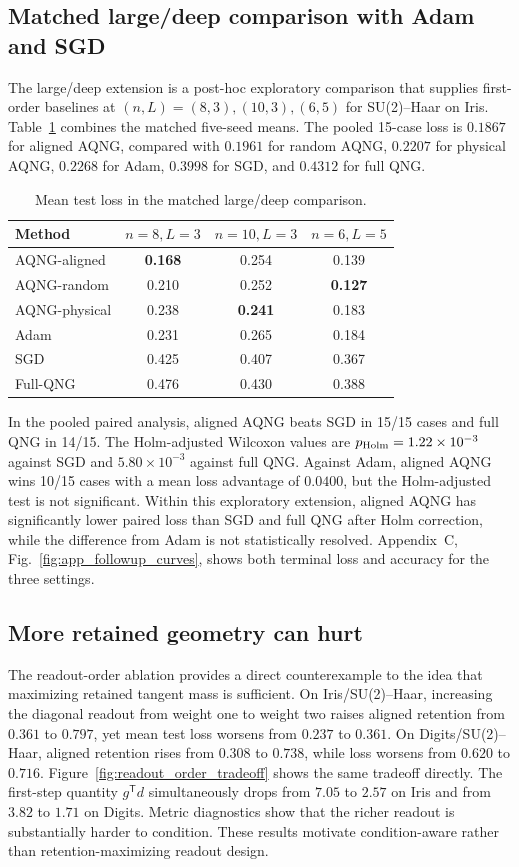 \subsection{Matched large/deep comparison with Adam and SGD}
The large/deep extension is a post-hoc exploratory comparison that supplies first-order baselines at $(n,L)=(8,3),(10,3),(6,5)$ for SU(2)--Haar on Iris. Table~\ref{tab:large_deep} combines the matched five-seed means. The pooled 15-case loss is $0.1867$ for aligned AQNG, compared with $0.1961$ for random AQNG, $0.2207$ for physical AQNG, $0.2268$ for Adam, $0.3998$ for SGD, and $0.4312$ for full QNG.

\begin{table}[t]
\centering
\caption{Mean test loss in the matched large/deep comparison.}
\label{tab:large_deep}
\begin{tabular}{lccc}
\toprule
Method & $n=8,L=3$ & $n=10,L=3$ & $n=6,L=5$ \\
\midrule
AQNG-aligned  & \textbf{0.168} & 0.254 & 0.139 \\
AQNG-random   & 0.210 & 0.252 & \textbf{0.127} \\
AQNG-physical & 0.238 & \textbf{0.241} & 0.183 \\
Adam          & 0.231 & 0.265 & 0.184 \\
SGD           & 0.425 & 0.407 & 0.367 \\
Full-QNG      & 0.476 & 0.430 & 0.388 \\
\bottomrule
\end{tabular}
\end{table}

In the pooled paired analysis, aligned AQNG beats SGD in 15/15 cases and full QNG in 14/15. The Holm-adjusted Wilcoxon values are $p_{\rm Holm}=1.22\times10^{-3}$ against SGD and $5.80\times10^{-3}$ against full QNG. Against Adam, aligned AQNG wins 10/15 cases with a mean loss advantage of $0.0400$, but the Holm-adjusted test is not significant. Within this exploratory extension, aligned AQNG has significantly lower paired loss than SGD and full QNG after Holm correction, while the difference from Adam is not statistically resolved. Appendix~C, Fig.~\ref{fig:app_followup_curves}, shows both terminal loss and accuracy for the three settings.

\subsection{More retained geometry can hurt}
The readout-order ablation provides a direct counterexample to the idea that maximizing retained tangent mass is sufficient. On Iris/SU(2)--Haar, increasing the diagonal readout from weight one to weight two raises aligned retention from $0.361$ to $0.797$, yet mean test loss worsens from $0.237$ to $0.361$. On Digits/SU(2)--Haar, aligned retention rises from $0.308$ to $0.738$, while loss worsens from $0.620$ to $0.716$. Figure~\ref{fig:readout_order_tradeoff} shows the same tradeoff directly. The first-step quantity $g^{\mathsf T}d$ simultaneously drops from $7.05$ to $2.57$ on Iris and from $3.82$ to $1.71$ on Digits. Metric diagnostics show that the richer readout is substantially harder to condition. These results motivate condition-aware rather than retention-maximizing readout design.

